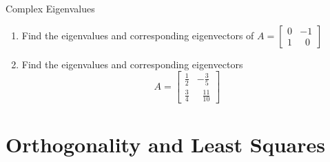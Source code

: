 \documentclass[10pt, aspectratio=169]{beamer}
\begin{document}
\begin{frame}{Complex Eigenvalues}
    \begin{enumerate}
        \item Find the eigenvalues and corresponding eigenvectors of \(A = \begin{bmatrix}
        0 & -1 \\ 1 & \;\;0
        \end{bmatrix}\)

        \item  Find the eigenvalues and corresponding eigenvectors \[A = \begin{bmatrix}
        \frac{1}{2} & -\frac{3}{5} \\ \frac{3}{4} & \;\;\frac{11}{10}
        \end{bmatrix}\]
    \end{enumerate}
\end{frame}



\section{Orthogonality and Least Squares}
\end{document}
